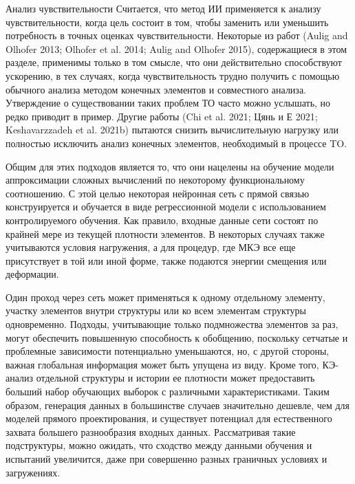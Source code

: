 Анализ чувствительности Считается, что метод ИИ применяется к анализу чувствительности, когда цель состоит в том, чтобы заменить или уменьшить потребность в точных оценках чувствительности. Некоторые из работ (Aulig and Olhofer 2013; Olhofer et al. 2014; Aulig and Olhofer 2015), содержащиеся в этом разделе, применимы только в том смысле, что они действительно способствуют ускорению, в тех случаях, когда чувствительность трудно получить с помощью обычного анализа методом конечных элементов и совместного анализа. Утверждение о существовании таких проблем ТО часто можно услышать, но редко приводит в пример. Другие работы (Chi et al. 2021; Цянь и Е 2021; Keshavarzzadeh et al. 2021b) пытаются снизить вычислительную нагрузку или полностью исключить анализ конечных элементов, необходимый в процессе TO.

Общим для этих подходов является то, что они нацелены на обучение модели аппроксимации сложных вычислений по некоторому функциональному соотношению. С этой целью некоторая нейронная сеть с прямой связью конструируется и обучается в виде регрессионной модели с использованием контролируемого обучения. Как правило, входные данные сети состоят по крайней мере из текущей плотности элементов. В некоторых случаях также учитываются условия нагружения, а для процедур, где МКЭ все еще присутствует в той или иной форме, также подаются энергии смещения или деформации.

Один проход через сеть может применяться к одному отдельному элементу, участку элементов внутри структуры или ко всем элементам структуры одновременно. Подходы, учитывающие только подмножества элементов за раз, могут обеспечить повышенную способность к обобщению, поскольку сетчатые и проблемные зависимости потенциально уменьшаются, но, с другой стороны, важная глобальная информация может быть упущена из виду. Кроме того, КЭ-анализ отдельной структуры и истории ее плотности может предоставить больший набор обучающих выборок с различными характеристиками. Таким образом, генерация данных в большинстве случаев значительно дешевле, чем для моделей прямого проектирования, и существует потенциал для естественного захвата большего разнообразия входных данных. Рассматривая такие подструктуры, можно ожидать, что сходство между данными обучения и испытаний увеличится, даже при совершенно разных граничных условиях и загружениях.


